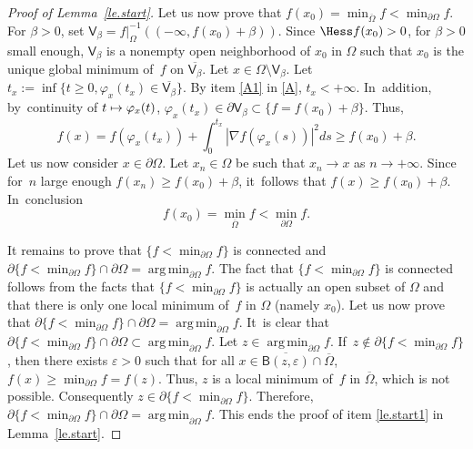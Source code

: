 \documentclass[JEP,XML,SOM,Unicode,NoEqCountersInSection,NoFloatCountersInSection,published]{cedram}
\newcommand\mto{\mathchoice{\longmapsto}{\mapsto}{\mapsto}{\mapsto}}
\let\pa\partial
\let\ve\varepsilon
\DeclareMathOperator*{\argmin}{arg\,min}
\theoremstyle{plain}
\theoremstyle{definition}
\begin{document}
\begin{proof}[Proof of Lemma~\ref{le.start}]
Let us now prove that $f(x_0)=\min_{\overline \Omega}f<\min_{\partial \Omega}f$. For $\beta >0$, set $\mathsf V_\beta=f|_{\Omega}^{-1}((-\infty,f(x_0)+ \beta))$. Since $\Hess f(x_0)>0$, for $\beta>0$ small enough,
$\mathsf V_\beta$ is a nonempty open neighborhood of $x_0$ in $\Omega$ such that
$x_0$ is the unique global minimum of~$f$ on $ \overline{\mathsf V_\beta}$.
Let $x\in \Omega\setminus {\mathsf V_\beta}$. Let $t_x:=\inf\{t\ge 0, \varphi_x(t_x)\in \overline{\mathsf V_\beta}\}$.
By item \eqref{A1} in \ref{A}, $t_x<+\infty$. In~addition, by~continuity of $t\mto \varphi_x(t)$, $\varphi_x(t_x)\in \pa \mathsf V_\beta\subset \{f=f(x_0)+\beta\}$. Thus,
\[
f(x) =f(\varphi_x({t_x})) + \int_0^{t_x} |\nabla f(\varphi_x(s))|^2ds \ge f(x_0)+\beta.
\]
Let us now consider $x\in \partial \Omega$. Let $x_n\in \Omega$ be such that $x_n\to x$ as $n\to +\infty$. Since for~$n$ large enough $f(x_n)\ge f(x_0)+\beta$, it~follows that $f(x)\ge f(x_0)+\beta$. In~conclusion
\[
f(x_0)=\min_{\overline \Omega}f<\min_{\partial \Omega}f.
\]

It remains to prove that
$\{f< \min_{\partial \Omega}f\}$ is connected and $\pa \{f< \min_{\partial \Omega}f\}\cap \partial \Omega =\argmin_{\partial \Omega}f$. The fact that $\{f< \min_{\partial \Omega}f\}$ is connected follows from the facts that $\{f< \min_{\partial \Omega}f\}$ is actually an open subset of $\Omega$ and that there is only one local minimum of~$f$ in $\Omega$ (namely $x_0$). Let us now prove that $\pa \{f< \min_{\partial \Omega}f\}\cap \partial \Omega =\argmin_{\partial \Omega}f$. It~is clear that $\pa \{f< \min_{\partial \Omega}f\}\cap \partial \Omega \subset \argmin_{\partial \Omega}f$. Let $z\in \argmin_{\partial \Omega}f$. If~$z\notin \pa \{f< \min_{\partial \Omega}f\}$, then there exists $\ve >0$ such that for all $x\in \overline{\mathsf B(z,\ve)}\cap \overline{\Omega}$, $f(x)\ge \min_{\partial \Omega}f=f(z)$. Thus, $z$ is a local minimum of~$f$ in $\overline \Omega$, which is not possible. Consequently $z\in \pa \{f< \min_{\partial \Omega}f\}$. Therefore, $\pa \{f< \min_{\partial \Omega}f\}\cap \partial \Omega =\argmin_{\partial \Omega}f$. This ends the proof of item \eqref{le.start1} in Lemma~\ref{le.start}.


\end{proof}
\end{document}
